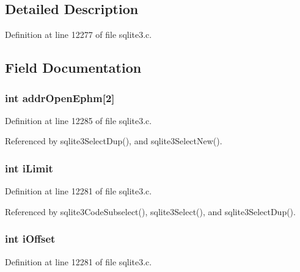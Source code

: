\subsection{Detailed Description}


Definition at line 12277 of file sqlite3.\+c.



\subsection{Field Documentation}
\hypertarget{struct_select_aec1d8ba6d2600933d0da4e8c138b760f}{}
\subsubsection[{addr\+Open\+Ephm}]{\setlength{\rightskip}{0pt plus 5cm}int addr\+Open\+Ephm\mbox{[}2\mbox{]}}\label{struct_select_aec1d8ba6d2600933d0da4e8c138b760f}


Definition at line 12285 of file sqlite3.\+c.



Referenced by sqlite3\+Select\+Dup(), and sqlite3\+Select\+New().

\hypertarget{struct_select_a2f7ebf02d49ab350a4978abefe1a6874}{}
\subsubsection[{i\+Limit}]{\setlength{\rightskip}{0pt plus 5cm}int i\+Limit}\label{struct_select_a2f7ebf02d49ab350a4978abefe1a6874}


Definition at line 12281 of file sqlite3.\+c.



Referenced by sqlite3\+Code\+Subselect(), sqlite3\+Select(), and sqlite3\+Select\+Dup().

\hypertarget{struct_select_a7257a503e6fefa9f18d900e52ec8dc75}{}
\subsubsection[{i\+Offset}]{\setlength{\rightskip}{0pt plus 5cm}int i\+Offset}\label{struct_select_a7257a503e6fefa9f18d900e52ec8dc75}


Definition at line 12281 of file sqlite3.\+c.



